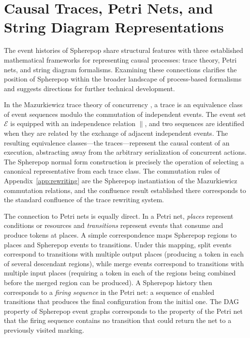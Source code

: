\documentclass[12pt]{article}
\theoremstyle{plain}
\theoremstyle{definition}
\theoremstyle{remark}
\begin{document}
\section{Causal Traces, Petri Nets, and String Diagram Representations}
\label{app:petri}

The event histories of Spherepop share structural features with three
established mathematical frameworks for representing causal processes: trace
theory, Petri nets, and string diagram formalisms.  Examining these
connections clarifies the position of Spherepop within the broader landscape
of process-based formalisms and suggests directions for further technical
development.

In the Mazurkiewicz trace theory of concurrency \citep{Mazurkiewicz1987}, a
trace is an equivalence class of event sequences modulo the commutation of
independent events.  The event set $\mathcal{E}$ is equipped with an
independence relation $\parallel$, and two sequences are identified when they
are related by the exchange of adjacent independent events.  The resulting
equivalence classes---the traces---represent the causal content of an execution,
abstracting away from the arbitrary serialization of concurrent actions.  The
Spherepop normal form construction is precisely the operation of selecting a
canonical representative from each trace class.  The commutation rules of
Appendix~\ref{app:rewriting} are the Spherepop instantiation of the Mazurkiewicz
commutation relations, and the confluence result established there corresponds
to the standard confluence of the trace rewriting system.

The connection to Petri nets \citep{Petri1966} is equally direct.  In a Petri
net, \emph{places} represent conditions or resources and \emph{transitions}
represent events that consume and produce tokens at places.  A simple
correspondence maps Spherepop regions to places and Spherepop events to
transitions.  Under this mapping, split events correspond to transitions with
multiple output places (producing a token in each of several descendant
regions), while merge events correspond to transitions with multiple input
places (requiring a token in each of the regions being combined before the
merged region can be produced).  A Spherepop history then corresponds to a
\emph{firing sequence} in the Petri net: a sequence of enabled transitions
that produces the final configuration from the initial one.  The DAG property
of Spherepop event graphs corresponds to the property of the Petri net that
the firing sequence contains no transition that could return the net to a
previously visited marking.
\end{document}

